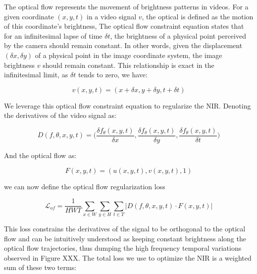 \documentclass{article}
\begin{document}

The optical flow represents the movement of brightness patterns in videos.
For a given coordinate $(x,y,t)$ in a video signal $v$, the optical is defined as the motion of this coordinate's brightness,
The optical flow constraint equation states that for an infinitesimal lapse of time $\delta t$,
the brightness of a physical point perceived by the camera should remain constant.
In other words, given the displacement $(\delta x, \delta y)$ of a physical point in the image coordinate system,
the image brightness $v$ should remain constant.
This relationship is exact in the infinitesimal limit, as  $\delta t$ tends to zero, we have:

\begin{equation}
v(x, y, t)=(x + \delta x, y + \delta y, t + \delta t)
\end{equation}

We leverage this optical flow constraint equation to regularize the NIR.
Denoting the derivatives of the video signal as:

\begin{equation}
D(f, \theta, x, y, t)=\Big(\frac{\delta f_{\theta}(x,y,t)}{\delta x}, \frac{\delta f_{\theta}(x,y,t)}{\delta y}, \frac{\delta f_{\theta}(x,y,t)}{\delta t}\Big)
\end{equation}

And the optical flow as:

\begin{equation}
F(x, y, t)=(u(x,y,t), v(x,y,t), 1)
\end{equation}

we can now define the optical flow regularization loss

\begin{equation}
\mathcal{L}_{of} = \frac{1}{HWT} \sum_{x \in W}\sum_{y \in H}\sum_{t \in T} | D(f, \theta, x, y, t) \cdot F(x, y, t) |
\end{equation}

This loss constrains the derivatives of the signal to be orthogonal to the optical flow and
can be intuitively understood as keeping constant brightness along the optical flow trajectories,
thus dumping the high frequency temporal variations observed in Figure XXX.
The total loss we use to optimize the NIR is a weighted sum of these two terms:
\end{document}
